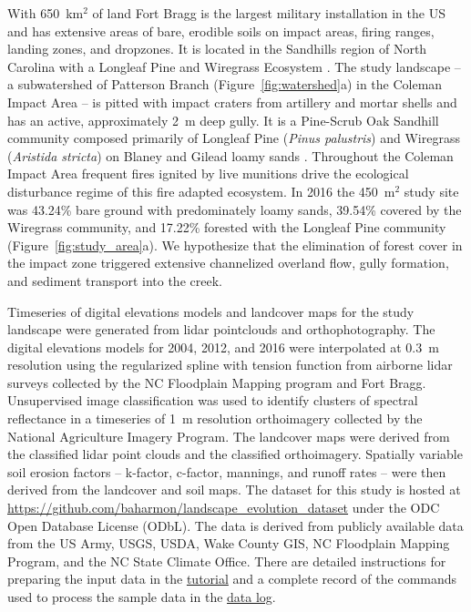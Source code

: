 \documentclass[gmd, manuscript]{copernicus}
\begin{document}
With 650~\unit{km}$^{2}$ of land
Fort Bragg is the largest military installation in the US
and has extensive areas of bare, erodible soils
on impact areas, firing ranges, landing zones, and dropzones. 
It is located in the Sandhills region of North Carolina 
with a Longleaf Pine and Wiregrass Ecosystem \citep{Sorrie2006}.
%
The study landscape 
-- a subwatershed of Patterson Branch (Figure~\ref{fig:watershed}a) 
in the Coleman Impact Area --
is pitted with impact craters from artillery and mortar shells
and has an active, approximately 2~\unit{m} deep gully. 
%
It is a Pine-Scrub Oak Sandhill community
composed primarily of Longleaf Pine (\emph{Pinus palustris})
and Wiregrass (\emph{Aristida stricta})
on Blaney and Gilead loamy sands 
\citep{Sorrie2004}. 
%
Throughout the Coleman Impact Area
frequent fires ignited by live munitions
drive the ecological disturbance regime
of this fire adapted ecosystem.
%
In 2016 the  450~\unit{m}$^{2}$ study site was
43.24\% bare ground with predominately loamy sands,
39.54\% covered by the Wiregrass community, and
17.22\% forested with the Longleaf Pine community 
(Figure~\ref{fig:study_area}a). 
%
We hypothesize that the elimination of forest cover
in the impact zone
triggered extensive channelized overland flow,
gully formation, and sediment transport into the creek. 

Timeseries of digital elevations models 
and landcover maps for the study landscape
were generated from lidar pointclouds and orthophotography.
The digital elevations models for 2004, 2012, and 2016
were interpolated at 0.3~\unit{m} resolution
using the regularized spline with tension function \citep{Mitasova1993,Mitasova2005}
from airborne lidar surveys 
collected by the NC Floodplain Mapping program and Fort Bragg. 
%
Unsupervised image classification 
was used to identify clusters of spectral reflectance
in a timeseries of 1~\unit{m} resolution orthoimagery 
collected by the National Agriculture Imagery Program.
The landcover maps were derived from the
classified lidar point clouds and the classified orthoimagery.
Spatially variable soil erosion factors 
-- k-factor, c-factor, mannings, and runoff rates --
were then derived from the landcover and soil maps.
The dataset for this study is hosted at 
\url{https://github.com/baharmon/landscape\_evolution_dataset}
under the ODC Open Database License (ODbL).
The data is derived from publicly available data from
the US Army, USGS, USDA, Wake County GIS, NC Floodplain
Mapping Program, and the NC State Climate Office.
There are detailed instructions for preparing the input data in the 
\href{https://github.com/baharmon/landscape_evolution/blob/master/tutorial.md}{tutorial}
and a complete record of the commands used to process the sample data in the
\href{https://github.com/baharmon/landscape_evolution_dataset/blob/master/nc_spm_evolution/DATA.md}{data log}.
\end{document}
